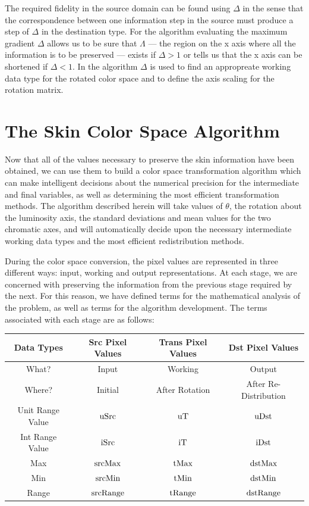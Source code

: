 The required fidelity in the source domain can be found using $ \Delta$ in the sense that the correspondence between one information step in the source must produce a step of $\Delta$ in the destination type. For the algorithm evaluating the maximum gradient $\Delta$ allows us to be sure that  $\Lambda$ --- the region on the x axis where all the information is to be preserved --- exists if $\Delta >1$ or tells us that the x axis can be shortened if  $\Delta < 1$. In the algorithm $\Delta$ is used to find an appropreate working data type for the rotated color space and to define the axis scaling for the rotation matrix.

\section{The Skin Color Space Algorithm}

Now that all of the values necessary to preserve the skin information have been obtained, we can use them to build a color space transformation algorithm which can make intelligent decisions about the numerical precision for the intermediate and final variables, as well as determining the most efficient transformation methods. The algorithm described herein will take values of $\theta$, the rotation about the luminosity axis, the standard deviations and mean values for the two chromatic axes, and will automatically decide upon the necessary intermediate working data types and the most efficient redistribution methods.

During the color space conversion, the pixel values are represented in three different ways: input, working and output representations. At each stage, we are concerned with preserving the information from the previous stage required by the next. For this reason, we have defined terms for the mathematical analysis of the problem, as well as terms for the algorithm development. The terms associated with each stage are as follows:

\begin{tabular}{|c|c|c|c|}
  \hline
     Data Types & Src Pixel Values & Trans Pixel Values & Dst Pixel Values \\ \hline
  What? & Input & Working & Output \\ \hline
  Where? & Initial & After Rotation & After Re-Distribution \\ \hline
  Unit Range Value & $ \text{uSrc} $ & $\text{uT}$ & $\text{uDst}$ \\ \cline{1-1}
  Int Range Value & $\text{iSrc}$ & $\text{iT}$ & $\text{iDst}$ \\ \cline{1-1}
  Max & $\text{srcMax}$ & $\text{tMax}$ & $\text{dstMax}$ \\ \cline{1-1}
  Min & $\text{srcMin}$ & $\text{tMin}$ & $\text{dstMin}$ \\ \cline{1-1}
  Range & $\text{srcRange}$ & $\text{tRange}$ & $\text{dstRange}$ \\
  \hline
\end{tabular}

